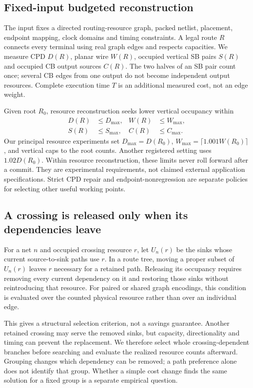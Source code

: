 \documentclass[conference,10pt]{IEEEtran}
\begin{document}
\subsection{Fixed-input budgeted reconstruction}
The input fixes a directed routing-resource graph, packed netlist, placement, endpoint mapping, clock domains and timing constraints. A legal route $R$ connects every terminal using real graph edges and respects capacities. We measure CPD $D(R)$, planar wire $W(R)$, occupied vertical SB pairs $S(R)$ and occupied CB output sources $C(R)$. The two halves of an SB pair count once; several CB edges from one output do not become independent output resources. Complete execution time $T$ is an additional measured cost, not an edge weight.

Given root $R_0$, resource reconstruction seeks lower vertical occupancy within
\begin{equation}
 \begin{aligned}
 D(R)&\le D_{\max}, & W(R)&\le W_{\max},\\
 S(R)&\le S_{\max}, & C(R)&\le C_{\max}.
 \end{aligned}
\label{eq:budget}
\end{equation}
Our principal resource experiments set $D_{\max}=D(R_0)$, $W_{\max}=\lceil1.001W(R_0)\rceil$, and vertical caps to the root counts. Another registered setting uses $1.02D(R_0)$. Within resource reconstruction, these limits never roll forward after a commit. They are experimental requirements, not claimed external application specifications. Strict CPD repair and endpoint-nonregression are separate policies for selecting other useful working points.

\subsection{A crossing is released only when its dependencies leave}
For a net $n$ and occupied crossing resource $r$, let $U_n(r)$ be the sinks whose current source-to-sink paths use $r$. In a route tree, moving a proper subset of $U_n(r)$ leaves $r$ necessary for a retained path. Releasing its occupancy requires removing every current dependency on it and restoring those sinks without reintroducing that resource. For paired or shared graph encodings, this condition is evaluated over the counted physical resource rather than over an individual edge.

This gives a structural selection criterion, not a savings guarantee. Another retained crossing may serve the removed sinks, but capacity, directionality and timing can prevent the replacement. We therefore select whole crossing-dependent branches before searching and evaluate the realized resource counts afterward. Grouping changes which dependency can be removed; a path preference alone does not identify that group. Whether a simple cost change finds the same solution for a fixed group is a separate empirical question.
\end{document}
